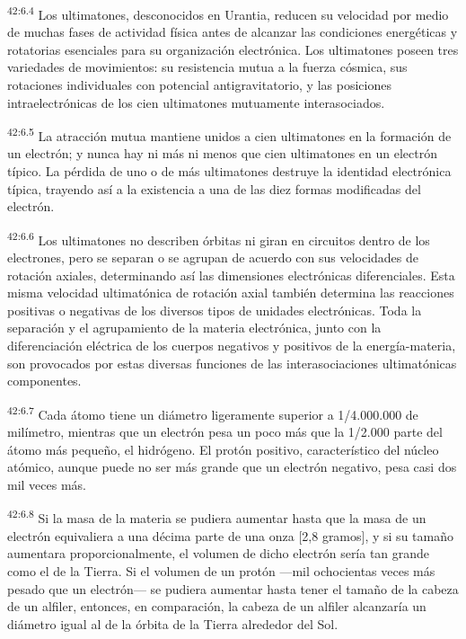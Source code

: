 \par
\textsuperscript{42:6.4} Los ultimatones, desconocidos en Urantia, reducen su velocidad por medio de muchas fases de actividad física antes de alcanzar las condiciones energéticas y rotatorias esenciales para su organización electrónica. Los ultimatones poseen tres variedades de movimientos: su resistencia mutua a la fuerza cósmica, sus rotaciones individuales con potencial antigravitatorio, y las posiciones intraelectrónicas de los cien ultimatones mutuamente interasociados.

\par
\textsuperscript{42:6.5} La atracción mutua mantiene unidos a cien ultimatones en la formación de un electrón; y nunca hay ni más ni menos que cien ultimatones en un electrón típico. La pérdida de uno o de más ultimatones destruye la identidad electrónica típica, trayendo así a la existencia a una de las diez formas modificadas del electrón.

\par
\textsuperscript{42:6.6} Los ultimatones no describen órbitas ni giran en circuitos dentro de los electrones, pero se separan o se agrupan de acuerdo con sus velocidades de rotación axiales, determinando así las dimensiones electrónicas diferenciales. Esta misma velocidad ultimatónica de rotación axial también determina las reacciones positivas o negativas de los diversos tipos de unidades electrónicas. Toda la separación y el agrupamiento de la materia electrónica, junto con la diferenciación eléctrica de los cuerpos negativos y positivos de la energía-materia, son provocados por estas diversas funciones de las interasociaciones ultimatónicas componentes.

\par
\textsuperscript{42:6.7} Cada átomo tiene un diámetro ligeramente superior a 1/4.000.000 de milímetro, mientras que un electrón pesa un poco más que la 1/2.000 parte del átomo más pequeño, el hidrógeno. El protón positivo, característico del núcleo atómico, aunque puede no ser más grande que un electrón negativo, pesa casi dos mil veces más.

\par
\textsuperscript{42:6.8} Si la masa de la materia se pudiera aumentar hasta que la masa de un electrón equivaliera a una décima parte de una onza [2,8 gramos], y si su tamaño aumentara proporcionalmente, el volumen de dicho electrón sería tan grande como el de la Tierra. Si el volumen de un protón ---mil ochocientas veces más pesado que un electrón--- se pudiera aumentar hasta tener el tamaño de la cabeza de un alfiler, entonces, en comparación, la cabeza de un alfiler alcanzaría un diámetro igual al de la órbita de la Tierra alrededor del Sol.

